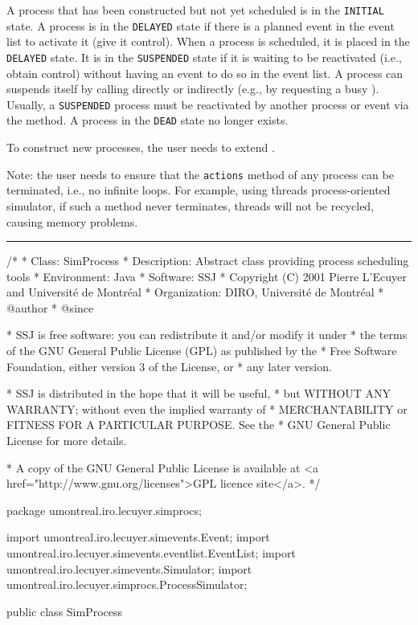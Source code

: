 A process that has been constructed but not yet scheduled is in
the \texttt{INITIAL} state.
A process is in the \texttt{DELAYED} state if there is a planned event
in the event list to activate it (give it control).
When a process is scheduled, it is placed in the \texttt{DELAYED} state.
It is in the \texttt{SUSPENDED} state if it is waiting to be reactivated
(i.e., obtain control) without having an event to do so in the event list.
A process can suspends itself by calling  directly or
indirectly (e.g., by requesting a busy ).
Usually, a \texttt{SUSPENDED} process must be reactivated by another process
or event via the  method.
A process in the \texttt{DEAD} state no longer exists.

To construct new processes, the user needs to extend .

Note: the user needs to ensure that the \texttt{actions}
method of any process can be terminated, i.e., no infinite loops.
For example, using threads process-oriented simulator,
if such a method never terminates, threads will not be recycled,
causing memory problems.

\bigskip\hrule

\begin{code}
\begin{hide}
/*
 * Class:        SimProcess
 * Description:  Abstract class providing process scheduling tools
 * Environment:  Java
 * Software:     SSJ 
 * Copyright (C) 2001  Pierre L'Ecuyer and Université de Montréal
 * Organization: DIRO, Université de Montréal
 * @author       
 * @since

 * SSJ is free software: you can redistribute it and/or modify it under
 * the terms of the GNU General Public License (GPL) as published by the
 * Free Software Foundation, either version 3 of the License, or
 * any later version.

 * SSJ is distributed in the hope that it will be useful,
 * but WITHOUT ANY WARRANTY; without even the implied warranty of
 * MERCHANTABILITY or FITNESS FOR A PARTICULAR PURPOSE.  See the
 * GNU General Public License for more details.

 * A copy of the GNU General Public License is available at
   <a href="http://www.gnu.org/licenses">GPL licence site</a>.
 */
\end{hide}
package umontreal.iro.lecuyer.simprocs;\begin{hide}

import umontreal.iro.lecuyer.simevents.Event;
import umontreal.iro.lecuyer.simevents.eventlist.EventList;
import umontreal.iro.lecuyer.simevents.Simulator;
import umontreal.iro.lecuyer.simprocs.ProcessSimulator;\end{hide}

public class SimProcess \begin{hide} {
\end{hide}
\end{code}

